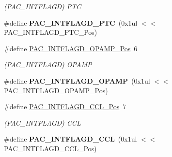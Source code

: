 \begin{DoxyCompactItemize}
\begin{DoxyCompactList}\small\item\em (P\+A\+C\+\_\+\+I\+N\+T\+F\+L\+A\+G\+D) P\+T\+C \end{DoxyCompactList}\item 
\hypertarget{group___s_a_m_l21___p_a_c_gaaf1a3c083f2324e37cfe5ee83ee56eaf}{}\#define {\bfseries P\+A\+C\+\_\+\+I\+N\+T\+F\+L\+A\+G\+D\+\_\+\+P\+T\+C}~(0x1ul $<$$<$ P\+A\+C\+\_\+\+I\+N\+T\+F\+L\+A\+G\+D\+\_\+\+P\+T\+C\+\_\+\+Pos)\label{group___s_a_m_l21___p_a_c_gaaf1a3c083f2324e37cfe5ee83ee56eaf}

\item 
\hypertarget{group___s_a_m_l21___p_a_c_ga8696f403e7ad0c1ae0e95cb9c63c4f77}{}\#define \hyperlink{group___s_a_m_l21___p_a_c_ga8696f403e7ad0c1ae0e95cb9c63c4f77}{P\+A\+C\+\_\+\+I\+N\+T\+F\+L\+A\+G\+D\+\_\+\+O\+P\+A\+M\+P\+\_\+\+Pos}~6\label{group___s_a_m_l21___p_a_c_ga8696f403e7ad0c1ae0e95cb9c63c4f77}

\begin{DoxyCompactList}\small\item\em (P\+A\+C\+\_\+\+I\+N\+T\+F\+L\+A\+G\+D) O\+P\+A\+M\+P \end{DoxyCompactList}\item 
\hypertarget{group___s_a_m_l21___p_a_c_gac5dfba171003d7bc6f185bf70c7f83d8}{}\#define {\bfseries P\+A\+C\+\_\+\+I\+N\+T\+F\+L\+A\+G\+D\+\_\+\+O\+P\+A\+M\+P}~(0x1ul $<$$<$ P\+A\+C\+\_\+\+I\+N\+T\+F\+L\+A\+G\+D\+\_\+\+O\+P\+A\+M\+P\+\_\+\+Pos)\label{group___s_a_m_l21___p_a_c_gac5dfba171003d7bc6f185bf70c7f83d8}

\item 
\hypertarget{group___s_a_m_l21___p_a_c_ga308f716d44e2a536d393e3e72b965c07}{}\#define \hyperlink{group___s_a_m_l21___p_a_c_ga308f716d44e2a536d393e3e72b965c07}{P\+A\+C\+\_\+\+I\+N\+T\+F\+L\+A\+G\+D\+\_\+\+C\+C\+L\+\_\+\+Pos}~7\label{group___s_a_m_l21___p_a_c_ga308f716d44e2a536d393e3e72b965c07}

\begin{DoxyCompactList}\small\item\em (P\+A\+C\+\_\+\+I\+N\+T\+F\+L\+A\+G\+D) C\+C\+L \end{DoxyCompactList}\item 
\hypertarget{group___s_a_m_l21___p_a_c_gac476e0686636cbc15b55aa0c46fd4052}{}\#define {\bfseries P\+A\+C\+\_\+\+I\+N\+T\+F\+L\+A\+G\+D\+\_\+\+C\+C\+L}~(0x1ul $<$$<$ P\+A\+C\+\_\+\+I\+N\+T\+F\+L\+A\+G\+D\+\_\+\+C\+C\+L\+\_\+\+Pos)\label{group___s_a_m_l21___p_a_c_gac476e0686636cbc15b55aa0c46fd4052}


\end{DoxyCompactItemize}
